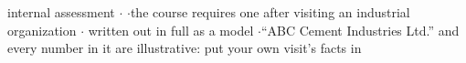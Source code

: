 \vspace{2pt}


{\color{sub}\footnotesize internal assessment \gap$\cdot$\gap {}
\gap$\cdot$\gap the course requires one after visiting an industrial organization \gap$\cdot$\gap
written out in full as a model \gap$\cdot$\gap ``ABC Cement Industries Ltd.'' and every number in it
are illustrative: put your own visit's facts in \gap \added}

\newcommand{\rch}[1]{\par\vspace{6pt}\Needspace{10\baselineskip}\noindent
  {\color{acc}\bfseries\large #1}\par\nobreak\vspace{-1pt}%
  \noindent{\color{acc}\rule{\textwidth}{0.6pt}}\par\nobreak\vspace{1pt}}

